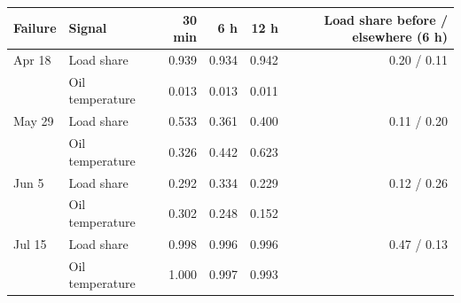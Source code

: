 \begin{tabular}{llrrrr}\toprule Failure & Signal & 30 min & 6 h & 12 h & Load share before / elsewhere (6 h)\\\midrule
Apr 18 & Load share & 0.939 & 0.934 & 0.942 & 0.20 / 0.11\\
 & Oil temperature & 0.013 & 0.013 & 0.011 & \\
May 29 & Load share & 0.533 & 0.361 & 0.400 & 0.11 / 0.20\\
 & Oil temperature & 0.326 & 0.442 & 0.623 & \\
Jun 5 & Load share & 0.292 & 0.334 & 0.229 & 0.12 / 0.26\\
 & Oil temperature & 0.302 & 0.248 & 0.152 & \\
Jul 15 & Load share & 0.998 & 0.996 & 0.996 & 0.47 / 0.13\\
 & Oil temperature & 1.000 & 0.997 & 0.993 & \\
\bottomrule\end{tabular}
